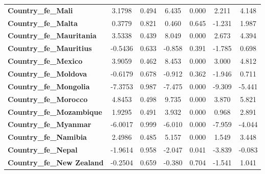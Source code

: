 \begin{center}
\begin{tabular}{lcccccc}
\textbf{Country\_fe\_Mali}                           &       3.1798  &        0.494     &     6.435  &         0.000        &        2.211    &        4.148     \\
\textbf{Country\_fe\_Malta}                          &       0.3779  &        0.821     &     0.460  &         0.645        &       -1.231    &        1.987     \\
\textbf{Country\_fe\_Mauritania}                     &       3.5338  &        0.439     &     8.049  &         0.000        &        2.673    &        4.394     \\
\textbf{Country\_fe\_Mauritius}                      &      -0.5436  &        0.633     &    -0.858  &         0.391        &       -1.785    &        0.698     \\
\textbf{Country\_fe\_Mexico}                         &       3.9059  &        0.462     &     8.453  &         0.000        &        3.000    &        4.812     \\
\textbf{Country\_fe\_Moldova}                        &      -0.6179  &        0.678     &    -0.912  &         0.362        &       -1.946    &        0.711     \\
\textbf{Country\_fe\_Mongolia}                       &      -7.3753  &        0.987     &    -7.475  &         0.000        &       -9.309    &       -5.441     \\
\textbf{Country\_fe\_Morocco}                        &       4.8453  &        0.498     &     9.735  &         0.000        &        3.870    &        5.821     \\
\textbf{Country\_fe\_Mozambique}                     &       1.9295  &        0.491     &     3.932  &         0.000        &        0.968    &        2.891     \\
\textbf{Country\_fe\_Myanmar}                        &      -6.0017  &        0.999     &    -6.010  &         0.000        &       -7.959    &       -4.044     \\
\textbf{Country\_fe\_Namibia}                        &       2.4986  &        0.485     &     5.157  &         0.000        &        1.549    &        3.448     \\
\textbf{Country\_fe\_Nepal}                          &      -1.9614  &        0.958     &    -2.047  &         0.041        &       -3.839    &       -0.083     \\
\textbf{Country\_fe\_New Zealand}                    &      -0.2504  &        0.659     &    -0.380  &         0.704        &       -1.541    &        1.041     \\

\end{tabular}
\end{center}
